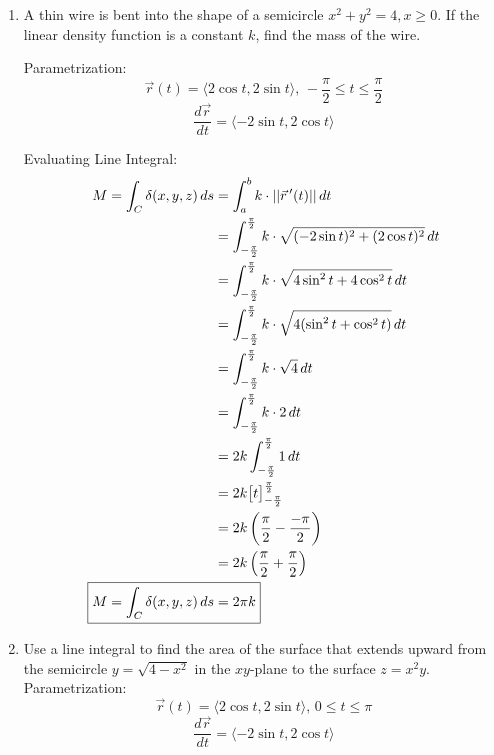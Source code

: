 \documentclass{article}
\begin{document}
\begin{enumerate}
    \item  A thin wire is bent into the shape of a semicircle $x^2 + y^2=4, x\ge 0$. If the linear density function is a  constant $k$, find the mass of the wire.
   
Parametrization: 
    $$\Vec{r}(t)=\langle 2\cos{t}, 2\sin{t}\rangle, \, -\frac{\pi}{2}\le t \le \frac{\pi}{2}$$
    $$\frac{d\Vec{r}}{dt}=\langle -2\sin{t}, 2\cos{t}\rangle$$
   
Evaluating Line Integral: 
\begin{align*}
    M=\int_C \delta(x,y,z)\,ds &= \int_{a}^b k \cdot ||\Vec{r}\,'(t)||\,dt\\
    &= \int_{-\frac{\pi}{2}}^\frac{\pi}{2} k \cdot \sqrt{(-2\sin{t})^2+(2\cos{t})^2}\,dt\\
    &= \int_{-\frac{\pi}{2}}^\frac{\pi}{2} k \cdot \sqrt{4\sin^2{t}+4\cos^2{t}}\,dt\\
    &= \int_{-\frac{\pi}{2}}^\frac{\pi}{2} k \cdot \sqrt{4(\sin^2{t}+\cos^2{t})}\,dt\\
    &= \int_{-\frac{\pi}{2}}^\frac{\pi}{2} k \cdot \sqrt{4}\,dt\\
    &= \int_{-\frac{\pi}{2}}^\frac{\pi}{2} k \cdot 2\,dt\\
    &= 2k\int_{-\frac{\pi}{2}}^\frac{\pi}{2} 1\,dt\\
    &= 2k\big[t\big]_{-\frac{\pi}{2}}^\frac{\pi}{2}\\
    &= 2k\left(\frac{\pi}{2}-\frac{-\pi}{2}\right)\\
    &= 2k\left(\frac{\pi}{2}+\frac{\pi}{2}\right)\\
    \Aboxed{M=\int_C \delta(x,y,z)\,ds & =2\pi k}\\
\end{align*}

    \item Use a line integral to find the area of the surface that extends upward from the semicircle $y=\sqrt{4-x^2}$ in the $xy$-plane to the surface $z=x^2y$.
Parametrization: 
    $$\Vec{r}(t)=\langle 2\cos t, 2\sin t\rangle, \, 0\le t\le \pi$$
    $$\frac{d\Vec{r}}{dt}=\langle -2\sin t,2\cos t\rangle$$
    

\end{enumerate}
\end{document}
